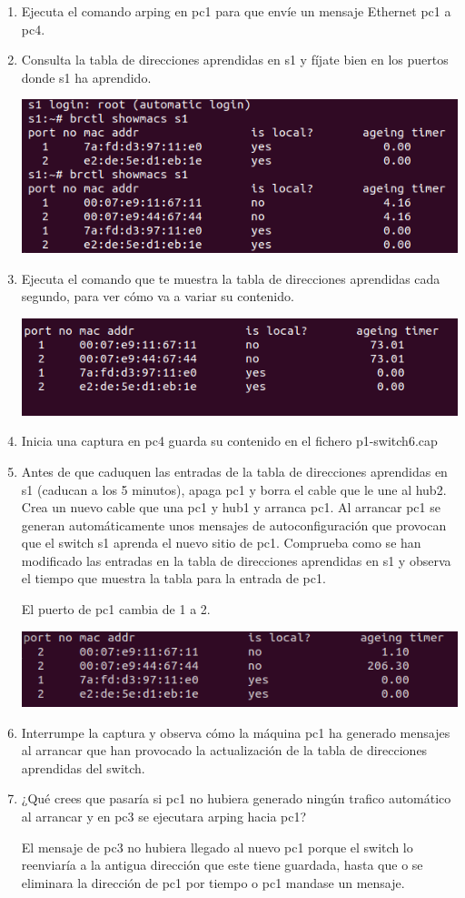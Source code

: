 \documentclass[12pt, a4paper]{report}
\begin{document}
\begin{enumerate}
	\item Ejecuta el comando arping en pc1 para que envíe un mensaje Ethernet pc1 a pc4.
	\item Consulta la tabla de direcciones aprendidas en s1 y fíjate bien en los puertos donde s1 ha aprendido.
	
	\includegraphics*[width=128mm, scale=0.5, center]{screenshot3}
	\item Ejecuta el comando que te muestra la tabla de direcciones aprendidas cada segundo, para ver cómo va a
	variar su contenido.
	
	\includegraphics*[width=128mm, scale=0.5, center]{screenshot4}
	\item Inicia una captura en pc4 guarda su contenido en el fichero p1-switch6.cap
	\item Antes de que caduquen las entradas de la tabla de direcciones aprendidas en s1 (caducan a los 5 minutos),
	apaga pc1 y borra el cable que le une al hub2. Crea un nuevo cable que una pc1 y hub1 y arranca pc1. Al
	arrancar pc1 se generan automáticamente unos mensajes de autoconfiguración que provocan que el switch
	s1 aprenda el nuevo sitio de pc1. Comprueba como se han modificado las entradas en la tabla de direcciones
	aprendidas en s1 y observa el tiempo que muestra la tabla para la entrada de pc1.
	
	El puerto de pc1 cambia de 1 a 2.
	
	\includegraphics*[width=128mm, scale= 0.5, center]{screenshot5}
	\item Interrumpe la captura y observa cómo la máquina pc1 ha generado mensajes al arrancar que han provocado
	la actualización de la tabla de direcciones aprendidas del switch.
	\item ¿Qué crees que pasaría si pc1 no hubiera generado ningún trafico automático al arrancar y en pc3 se ejecutara
	arping hacia pc1?
	
	El mensaje de pc3 no hubiera llegado al nuevo pc1 porque el switch lo reenviaría a la antigua dirección que este tiene guardada, hasta que o se eliminara la dirección de pc1 por tiempo o pc1 mandase un mensaje.
\end{enumerate}
\end{document}
